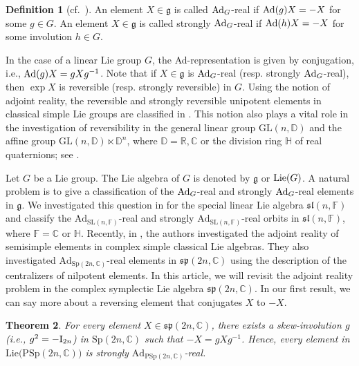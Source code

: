 \documentclass[11pt,reqno]{amsart}
\numberwithin{equation}{section}
\newtheorem{theorem}{Theorem}[section]
\theoremstyle{definition}
\newtheorem{definition}[theorem]{Definition}
\def\R{\mathbb R}
\def\C{\mathbb C}
\def\D{\mathbb D}
\def\R{\mathbb R}
\def\g{\mathcal G}
\def\R{\mathbb {R}}
\def\C{\mathbb {C}}
\def\g{\mathfrak {g}}
\begin{document}
\begin{definition}[cf.~{\cite[Definition 1.1]{GM1}}]
	An element $X\in \g$ is called $ {\rm Ad}_G$-real  if ${\rm Ad}(g)X  =-X$ for some $g\in G$.  An  element $X\in \g$  is called strongly $ {\rm Ad}_G$-real if $ {\rm Ad}(h)X  =-X  $ for some involution   $h\in G$.
\end{definition}
In the case of a linear Lie group $G$, the Ad-representation is given by conjugation, i.e., ${\rm Ad}(g)X = gXg^{-1}$.   
Note that if $X\in \g$ is  $ {\rm Ad}_G$-real (resp. strongly $ {\rm Ad}_G$-real), then $\exp X$ is reversible (resp. strongly reversible) in $G$. Using the notion of adjoint reality, the reversible and strongly reversible unipotent elements in classical simple Lie groups are classified in \cite{GM1}. 
This notion also plays a vital role in the investigation of reversibility in the general linear group $\mathrm{GL}(n,\D)$ and the affine group $\mathrm{GL}(n,\D) \ltimes \D^{n}$, where $\D =\R, \C$ or the division ring $\mathbb{H}$ of real quaternions; see  \cite{GLM2, GLM3}.


Let $G$ be a Lie group. The Lie algebra of $G$ is denoted by $\mathfrak{g}$ or ${\rm Lie}(G)$. A natural problem is to give a classification of the $ {\rm Ad}_G$-real and strongly $ {\rm Ad}_G$-real elements in $\mathfrak{g}$. We investigated this question in \cite{GLM1} for the special linear Lie algebra $\mathfrak{sl}(n,\mathbb{F})$ and  classify the $\mathrm{Ad}_{\mathrm{SL}(n,\mathbb{F})}$-real  and strongly $\mathrm{Ad}_{\mathrm{SL}(n,\mathbb{F})}$-real  orbits in  $\mathfrak{sl}(n,\mathbb{F})$, where $\mathbb{F}= \mathbb{C}$ or  $\mathbb{H}$. Recently, in \cite{GM2}, the authors investigated the adjoint reality of semisimple elements in complex simple classical Lie algebras. 
They also investigated  $\mathrm{Ad}_{\mathrm{Sp}(2n,\mathbb{C})}$-real  elements in $\mathfrak{sp}(2n,\mathbb{C})$ using the description of the centralizers of  nilpotent elements.  
In this article, we will revisit the adjoint reality problem in the complex symplectic Lie algebra $\mathfrak{sp}(2n,\mathbb{C})$.  
In our first result, we can say more about a reversing element that conjugates $X$ to $-X$.

\begin{theorem}\label{thm-real-skew-inv}
	For  every element $X \in \mathfrak{sp}(2n,\mathbb{C})$,  there exists a skew-involution $g$ (i.e., $g^2 =-{\rm I}_{2n}$) in  $\mathrm{Sp}(2n,\mathbb{C})$ such that $-X =gXg^{-1}$. Hence,  every element in $\mathrm{Lie(PSp}(2n,\C))$ is strongly $\mathrm{Ad}_{\mathrm{PSp}(2n,\mathbb{C})}$-real.  
\end{theorem}
\end{document}
